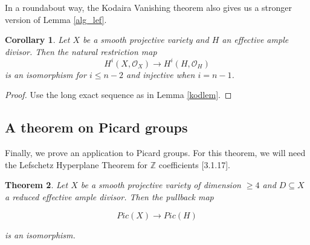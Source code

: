 \documentclass[a4paper]{article}
\newcommand{\OO}{\mathcal{O}}
\newcommand{\Z}{\mathbb{Z}}
\newtheorem{theorem}{Theorem}
\newtheorem{corollary}[theorem]{Corollary}
\numberwithin{theorem}{section}
\numberwithin{equation}{section}
\begin{document}
In a roundabout way, the Kodaira Vanishing theorem also gives us a stronger version of Lemma \ref{alg_lef}.

\begin{corollary} \label{ressurj}
    Let $X$ be a smooth projective variety and $H$ an effective ample divisor. Then the natural restriction map
    $$ H^i(X,\OO_X) \rightarrow H^i(H,\OO_H) $$
    is an isomorphism  for $i \leq n-2$ and injective when $i = n-1$.
\end{corollary}

\begin{proof}
    Use the long exact sequence as in Lemma \ref{kodlem}.
\end{proof}

\subsection{A theorem on Picard groups}

Finally, we prove an application to Picard groups. For this theorem, we will need the Lefschetz Hyperplane Theorem for $\Z$ coefficients \cite{MR2095471}[3.1.17].

\begin{theorem}
    Let $X$ be a smooth projective variety of dimension $\geq 4$ and $D \subseteq X$ a reduced effective ample divisor. Then the pullback map

    $$ Pic(X) \rightarrow Pic(H) $$

    is an isomorphism.
\end{theorem}
\end{document}
